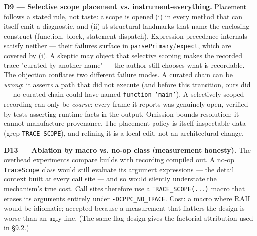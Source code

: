 \textbf{D9 --- Selective scope placement vs. instrument-everything.}
Placement follows a stated rule, not taste: a scope is opened (i) in
every method that can itself emit a diagnostic, and (ii) at
structural landmarks that name the enclosing construct (function,
block, statement dispatch). Expression-precedence internals satisfy
neither --- their failures surface in \texttt{parsePrimary}/\texttt{expect}, which
are covered by (i). A skeptic may object that selective scoping makes
the recorded trace "curated by another name" --- the author still
chooses what is recordable. The objection conflates two different
failure modes. A curated chain can be \emph{wrong}: it asserts a path that
did not execute (and before this transition, ours did --- no curated
chain could have named \texttt{function 'main'}). A selectively scoped
recording can only be \emph{coarse}: every frame it reports was genuinely
open, verified by tests asserting runtime facts in the output.
Omission bounds resolution; it cannot manufacture provenance. The
placement policy is itself inspectable data (grep \texttt{TRACE\_SCOPE}), and
refining it is a local edit, not an architectural change.

\textbf{D13 --- Ablation by macro vs. no-op class (measurement honesty).}
The overhead experiments compare builds with recording compiled out.
A no-op \texttt{TraceScope} class would still evaluate its argument
expressions --- the detail context built at every call site --- and so
would silently understate the mechanism's true cost. Call sites
therefore use a \texttt{TRACE\_SCOPE(...)} macro that erases its arguments
entirely under \texttt{-DCPPC\_NO\_TRACE}. Cost: a macro where RAII would be
idiomatic; accepted because a measurement that flatters the design is
worse than an ugly line. (The same flag design gives the factorial
attribution used in \S9.2.)

